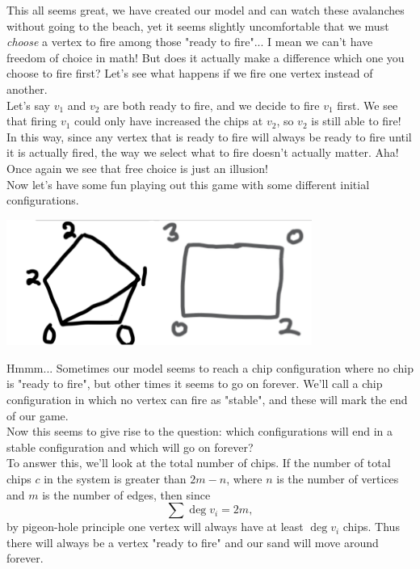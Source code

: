 \documentclass{article}
\begin{document}
This all seems great, we have created our model and can watch these avalanches without going to the beach, yet it seems slightly uncomfortable that we must \emph{choose} a vertex to fire among those "ready to fire"... I mean we can't have freedom of choice in math! But does it actually make a difference which one you choose to fire first? Let's see what happens if we fire one vertex instead of another.\\

Let's say $v_1$ and $v_2$ are both ready to fire, and we decide to fire $v_1$ first. We see that firing $v_1$ could only have increased the chips at $v_2$, so $v_2$ is still able to fire! In this way, since any vertex that is ready to fire will always be ready to fire until it is actually fired, the way we select what to fire doesn't actually matter. Aha! Once again we see that free choice is just an illusion!\\

Now let's have some fun playing out this game with some different initial configurations. 

\begin{center}
    \includegraphics[width=10cm, scale=1]{images/example configs.png}
\end{center}

Hmmm... Sometimes our model seems to reach a chip configuration where no chip is "ready to fire", but other times it seems to go on forever. We'll call a chip configuration in which no vertex can fire as "stable", and these will mark the end of our game. \\

Now this seems to give rise to the question: which configurations will end in a stable configuration and which will go on forever? \\

To answer this, we'll look at the total number of chips. If the number of total chips $c$ in the system is greater than $2m-n$, where $n$ is the number of vertices and $m$ is the number of edges, then since $$\sum \deg{v_i}=2m,$$ by pigeon-hole principle one vertex will always have at least $\deg{v_i}$ chips. Thus there will always be a vertex "ready to fire" and our sand will move around forever.\\
\end{document}
